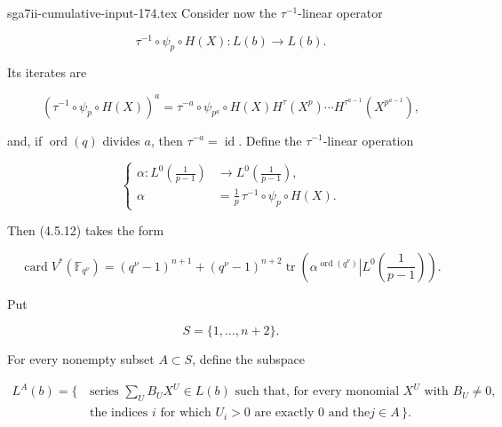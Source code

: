 \begin{filecontents*}{sga7ii-cumulative-input-174.tex}
Consider now the $\tau^{-1}$-linear operator

\begin{equation}\tag{4.5.13}
\tau^{-1}\circ\psi_p\circ H(X):L(b)\longrightarrow L(b).
\end{equation}

Its iterates are

\begin{equation}\tag{4.5.14}
(\tau^{-1}\circ\psi_p\circ H(X))^a
=\tau^{-a}\circ\psi_{p^a}\circ
H(X)H^\tau(X^p)\cdots H^{\tau^{a-1}}(X^{p^{a-1}}),
\end{equation}

and, if $\operatorname{ord}(q)$ divides $a$, then $\tau^{-a}=\operatorname{id}$.
Define the $\tau^{-1}$-linear operation

\begin{equation}\tag{4.5.15}
\left\{
\begin{aligned}
\alpha:L^0\!\left(\frac1{p-1}\right)
&\longrightarrow L^0\!\left(\frac1{p-1}\right),\\
\alpha&=\frac1p\,\tau^{-1}\circ\psi_p\circ H(X).
\end{aligned}
\right.
\end{equation}

Then (4.5.12) takes the form

\begin{equation}\tag{4.5.16}
\operatorname{card}V^*(\mathbb F_{q^\nu})
=(q^\nu-1)^{n+1}
+(q^\nu-1)^{n+2}
\operatorname{tr}\!\left(
\left.\alpha^{\operatorname{ord}(q^\nu)}
\right|L^0\!\left(\frac1{p-1}\right)\right).
\end{equation}

Put

\begin{equation}\tag{4.5.17}
S=\{1,\ldots,n+2\}.
\end{equation}

For every nonempty subset $A\subset S$, define the subspace

\begin{equation}\tag{4.5.18}
\begin{aligned}
L^A(b)=\{\,&\text{series $\sum_U B_UX^U\in L(b)$ such that, for every
monomial $X^U$ with $B_U\ne0$,}\\
&\text{the indices $i$ for which $U_i>0$ are exactly $0$ and the
$j\in A$}\,\}.
\end{aligned}
\end{equation}


\end{filecontents*}
